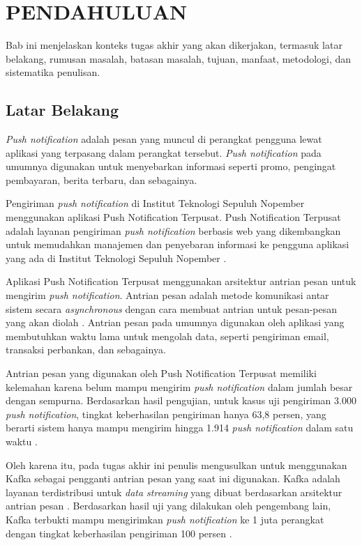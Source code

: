 \vspace{0ex}
\chapter {PENDAHULUAN}
\par Bab ini menjelaskan konteks tugas akhir yang akan dikerjakan, termasuk latar belakang, rumusan masalah, batasan masalah, tujuan, manfaat, metodologi, dan sistematika penulisan.

\section{Latar Belakang}
\par \textit{Push notification} adalah pesan yang muncul di perangkat pengguna lewat aplikasi yang terpasang dalam perangkat tersebut. \textit{Push notification} pada umumnya digunakan untuk menyebarkan informasi seperti promo, pengingat pembayaran, berita terbaru, dan sebagainya.
\par Pengiriman \textit{push notification} di Institut Teknologi Sepuluh Nopember menggunakan aplikasi Push Notification Terpusat. Push Notification Terpusat adalah layanan pengiriman \textit{push notification} berbasis web yang dikembangkan untuk memudahkan manajemen dan penyebaran informasi ke pengguna aplikasi yang ada di Institut Teknologi Sepuluh Nopember \cite{application-thesis}.
\par Aplikasi Push Notification Terpusat menggunakan arsitektur antrian pesan untuk mengirim \textit{push notification}. Antrian pesan adalah metode komunikasi antar sistem secara \textit{asynchronous} dengan cara membuat antrian untuk pesan-pesan yang akan diolah \cite{message-queue-online}. Antrian pesan pada umumnya digunakan oleh aplikasi yang membutuhkan waktu lama untuk mengolah data, seperti pengiriman email, transaksi perbankan, dan sebagainya.
\par Antrian pesan yang digunakan oleh Push Notification Terpusat memiliki kelemahan karena belum mampu mengirim \textit{push notification} dalam jumlah besar dengan sempurna. Berdasarkan hasil pengujian, untuk kasus uji pengiriman 3.000 \textit{push notification}, tingkat keberhasilan pengiriman hanya 63,8 persen, yang berarti sistem hanya mampu mengirim hingga 1.914 \textit{push notification} dalam satu waktu \cite{application-thesis}.
\par Oleh karena itu, pada tugas akhir ini penulis mengusulkan untuk menggunakan Kafka sebagai pengganti antrian pesan yang saat ini digunakan. Kafka adalah layanan terdistribusi untuk \textit{data streaming} yang dibuat berdasarkan arsitektur antrian pesan \cite{kafka-online}. Berdasarkan hasil uji yang dilakukan oleh pengembang lain, Kafka terbukti mampu mengirimkan \textit{push notification} ke 1 juta perangkat dengan tingkat keberhasilan pengiriman 100 persen \cite{prototype-article}.

